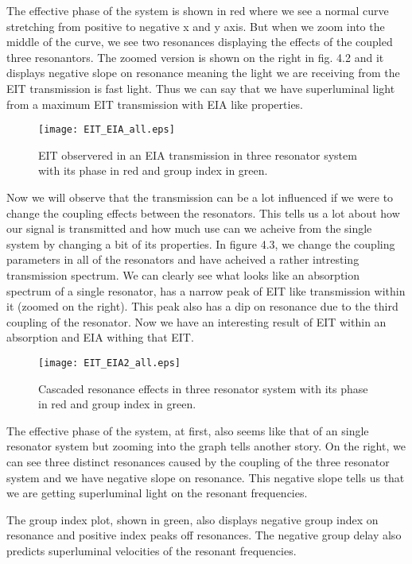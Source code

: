 The effective phase of the system is shown in red where we see a normal curve stretching from positive to negative x and y axis. But when we zoom into the middle of the curve, we see two resonances displaying the effects of the coupled three resonantors. The zoomed version is shown on the right in fig. 4.2 and it displays negative slope on resonance meaning the light we are receiving from the EIT transmission is fast light. Thus we can say that we have superluminal light from a maximum EIT transmission with EIA like properties.

\begin{figure}[h]
\centering
\texttt{[image: EIT\_EIA\_all.eps]}
\caption{EIT observered in an EIA transmission in three resonator system with its phase in red and group index in green.}
\end{figure}


Now we will observe that the transmission can be a lot influenced if we were to change the coupling effects between the resonators. This tells us a lot about how our signal is transmitted and how much use can we acheive from the single system by changing a bit of its properties. In figure 4.3, we change the coupling parameters in all of the resonators and have acheived a rather intresting transmission spectrum. We can clearly see what looks like an absorption spectrum of a single resonator, has a narrow peak of EIT like transmission within it (zoomed on the right). This peak also has a dip on resonance due to the third coupling of the resonator. Now we have an interesting result of EIT within an absorption and EIA withing that EIT. 

\begin{figure}[h]
\centering
\texttt{[image: EIT\_EIA2\_all.eps]}
\caption{Cascaded resonance effects in three resonator system with its phase in red and group index in green.}
\end{figure}


The effective phase of the system, at first, also seems like that of an single resonator system but zooming into the graph tells another story. On the right, we can see three distinct resonances caused by the coupling of the three resonator system and we have negative slope on resonance. This negative slope tells us that we are getting superluminal light on the resonant frequencies. 

The group index plot, shown in green, also displays negative group index on resonance and positive index peaks off resonances. The negative group delay also predicts superluminal velocities of the resonant frequencies.

